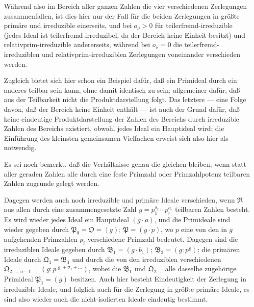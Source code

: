 \documentclass[fontsize=10pt,paper=a5,pagesize,headings=small]{scrbook}
\newcommand{\ideal}[1]{\mathfrak{#1}}
\newcommand{\ring}[1]{\mathfrak{#1}}
\theoremstyle{plain}
\begin{document}
Während also im Bereich aller ganzen Zahlen die vier verschiedenen
Zerlegungen zusammenfallen, ist dies hier nur der Fall für die beiden
Zerlegungen in größte primäre und irreduzible einerseits, und bei $o_\nu > 0$
für teilerfremd-irreduzible (jedes Ideal ist teilerfremd-irreduzibel, da der
Bereich keine Einheit besitzt) und relativprim-irreduzible andererseits,
während bei $o_\nu = 0$ die teilerfremd-irreduziblen und relativprim-irreduziblen
Zerlegungen voneinander verschieden werden.

Zugleich bietet sich hier schon ein Beispiel dafür, daß ein Primideal
durch ein anderes teilbar sein kann, ohne damit identisch zu sein; allgemeiner
dafür, daß aus der Teilbarkeit nicht die Produktdarstellung folgt. Das
letztere --- eine Folge davon, daß der Bereich keine Einheit enthält ---
ist auch der Grund dafür, daß keine eindeutige Produktdarstellung der Zahlen
des Bereichs durch irreduzible Zahlen des Bereichs existiert, obwohl jedes
Ideal ein Hauptideal wird; die Einführung des kleinsten gemeinsamen
Vielfachen erweist sich also hier als notwendig.

Es sei noch bemerkt, daß die Verhältnisse genau die gleichen bleiben,
wenn statt aller geraden Zahlen alle durch eine feste Primzahl oder
Primzahlpotenz teilbaren Zahlen zugrunde gelegt werden.

Dagegen werden auch noch irreduzible und primäre Ideale verschieden,
wenn $\ring{R}$ aus allen durch eine zusammengesetzte Zahl $g = p_1^{o_1}\cdots p_r^{o_r}$
teilbaren Zahlen besteht. Es wird wieder jedes Ideal ein Hauptideal
$(g \cdot a)$, und die Primideale sind wieder gegeben durch
$\ideal{P}_0 = \ideal{O} = (g)$; $\ideal{P} = (g \cdot p)$, wo $p$ eine von den in $g$
aufgehenden Primzahlen $p_i$ verschiedene Primzahl bedeutet. Dagegen sind die
irreduziblen Ideale gegeben durch $\ideal{B}_1 = (g \cdot b_1)$;
$\ideal{B}_2 = (g : p^\varrho)$; die primären Ideale durch $\ideal{Q}_1 = \ideal{B}_1$
und durch die von den irreduziblen verschiedenen
$\ideal{Q}_{2,\dots,o-1} = (g : p^{\varrho+\sigma_1+\dots})$, wobei die $\ideal{B}_1$ und
$\ideal{Q}_{2,\dots}$ alle dasselbe zugehörige Primideal $\ideal{P}_1 = (g)$ besitzen.
Auch hier besteht Eindeutigkeit der Zerlegung in irreduzible Ideale, und
folglich auch für die Zerlegung in größte primäre Ideale, es sind also
wieder auch die nicht-isolierten Ideale eindeutig bestimmt.

\subsection{}
\end{document}
